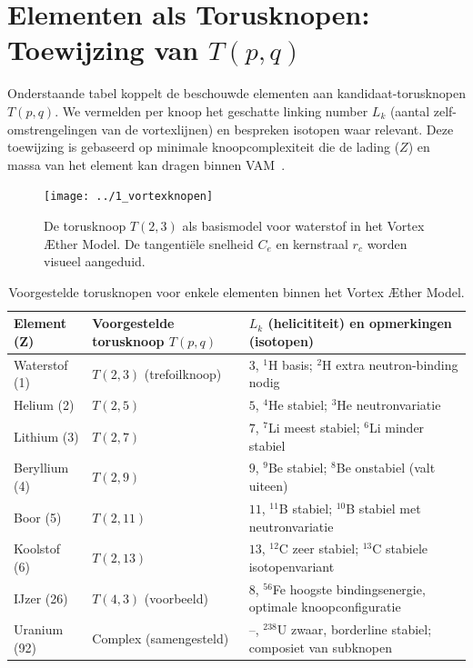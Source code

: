 \section{Elementen als Torusknopen: Toewijzing van $T(p,q)$}

Onderstaande tabel koppelt de beschouwde elementen aan kandidaat-torusknopen $T(p,q)$. We vermelden per knoop het geschatte linking number $L_k$ (aantal zelf-omstrengelingen van de vortexlijnen) en bespreken isotopen waar relevant. Deze toewijzing is gebaseerd op minimale knoopcomplexiteit die de lading ($Z$) en massa van het element kan dragen binnen VAM~\cite{Kleckner2013KnotsVortex}.
\begin{figure}[H]
    \centering
    \texttt{[image: ../1\_vortexknopen]}
    \caption{De torusknoop $T(2,3)$ als basismodel voor waterstof in het Vortex Æther Model. De tangentiële snelheid $C_e$ en kernstraal $r_c$ worden visueel aangeduid.}
    \label{fig:torus_t23}
\end{figure}

\begin{table}[h!]
    \centering
    \begin{tabular}{lll}
        \hline
        Element (Z) & Voorgestelde torusknoop $T(p,q)$ & $L_k$ (helicititeit) en opmerkingen (isotopen)\\
        \hline
        Waterstof (1) & $T(2,3)$ (trefoilknoop)~\cite{Faddeev1997KnottedSolitions} & $3$, $^1$H basis; $^2$H extra neutron-binding nodig\\
        Helium (2) & $T(2,5)$ & $5$, $^4$He stabiel; $^3$He neutronvariatie\\
        Lithium (3) & $T(2,7)$ & $7$, $^7$Li meest stabiel; $^6$Li minder stabiel\\
        Beryllium (4) & $T(2,9)$ & $9$, $^9$Be stabiel; $^8$Be onstabiel (valt uiteen)\\
        Boor (5) & $T(2,11)$ & $11$, $^{11}$B stabiel; $^{10}$B stabiel met neutronvariatie\\
        Koolstof (6) & $T(2,13)$ & $13$, $^{12}$C zeer stabiel; $^{13}$C stabiele isotopenvariant\\
        IJzer (26) & $T(4,3)$ (voorbeeld) & $8$, $^{56}$Fe hoogste bindingsenergie, optimale knoopconfiguratie\\
        Uranium (92) & Complex (samengesteld) & –, $^{238}$U zwaar, borderline stabiel; composiet van subknopen\\
        \hline
    \end{tabular}
    \caption{Voorgestelde torusknopen voor enkele elementen binnen het Vortex Æther Model.}\label{tab:table}
\end{table}


